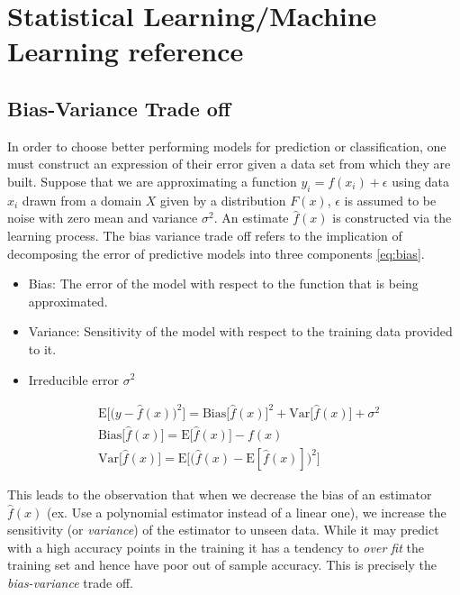 \chapter{Statistical Learning/Machine Learning reference}
\label{app:2}
\section{Bias-Variance Trade off}
\label{app:biasvar}
In order to choose better performing models for prediction or classification, one must construct an expression of their error given a data set from which they are built. Suppose that we are approximating a function $y_i = f(x_i) + \epsilon$ using data $x_i$ drawn from a domain $X$ given by a distribution $F(x)$, $\epsilon$ is assumed to be noise with zero mean and variance $\sigma^2$. An estimate $\hat{f}(x)$ is constructed via the learning process. The bias variance trade off refers to the implication of decomposing the error of predictive models into three components \ref{eq:bias}.

\begin{itemize}
\item Bias: The error of the model with respect to the function that is being approximated.
\item Variance: Sensitivity of the model with respect to the training data provided to it.
\item Irreducible error $\sigma^2$
\end{itemize}

\begin{align} \label{eq:bias}
& \mathrm{E}\Big[\big(y - \hat{f}(x)\big)^2\Big] = \mathrm{Bias}\big[\hat{f}(x)\big]^2 + \mathrm{Var}\big[\hat{f}(x)\big] + \sigma^2 \\
& \mathrm{Bias}\big[\hat{f}(x)\big] = \mathrm{E}\big[\hat{f}(x)\big] - f(x) \\
& \mathrm{Var}\big[\hat{f}(x)\big] = \mathrm{E}\Big[ \big( \hat{f}(x) - \mathrm{E}[\hat{f}(x)] \big)^2 \Big]
\end{align}

This leads to the observation that when we decrease the bias of an estimator $\hat{f}(x)$ (ex. Use a polynomial estimator instead of a linear one), we increase the sensitivity (or \emph{variance}) of the estimator to unseen data. While it may predict with a high accuracy points in the training it has a tendency to \emph{over fit} the training set and hence have poor out of sample accuracy. This is precisely the \emph{bias-variance} trade off.

